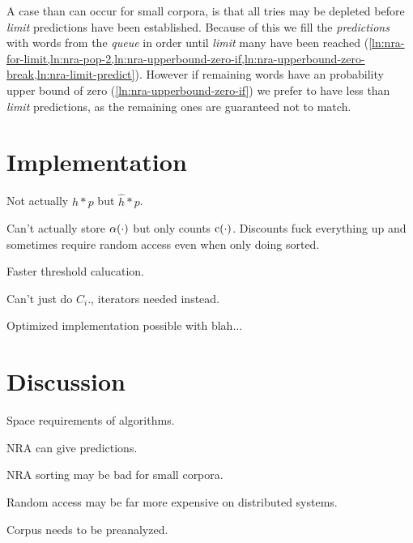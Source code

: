 A case than can occur for small corpora, is that all tries may be depleted
before \emph{limit} predictions have been established.
Because of this we fill the \emph{predictions} with words from the \emph{queue}
in order until \emph{limit} many have been reached
(\cref{ln:nra-for-limit,ln:nra-pop-2,ln:nra-upperbound-zero-if,ln:nra-upperbound-zero-break,ln:nra-limit-predict}).
However if remaining words have an probability upper bound of zero
(\cref{ln:nra-upperbound-zero-if}) we prefer to have less than \emph{limit}
predictions, as the remaining ones are guaranteed not to match.


\section{Implementation}

\begin{draft}
Not actually $h * p$ but $\hat{h} * p$.

Can't actually store $\alpha(\cdot)$ but only counts $\operatorname{c}(\cdot)$.
Discounts fuck everything up and sometimes require random access even when only
doing sorted.

Faster threshold calucation.

Can't just do $C_i$., iterators needed instead.

Optimized  implementation possible with blah...
\end{draft}

\section{Discussion}

\begin{draft}
Space requirements of algorithms.

NRA can give predictions.

NRA sorting may be bad for small corpora.

Random access may be far more expensive on distributed systems.

Corpus needs to be preanalyzed.
\end{draft}

